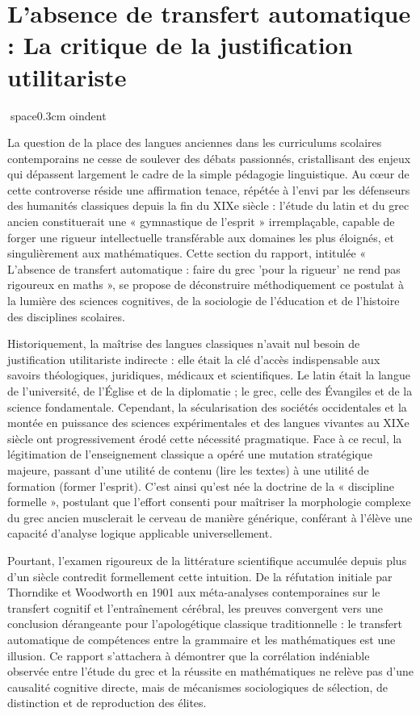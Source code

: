 

\section{L'absence de transfert automatique : La critique de la justification utilitariste}
space{0.3cm}
oindent

La question de la place des langues anciennes dans les curriculums scolaires contemporains ne cesse
de soulever des débats passionnés, cristallisant des enjeux qui dépassent largement le cadre de la
simple pédagogie linguistique. Au cœur de cette controverse réside une affirmation tenace, répétée à
l'envi par les défenseurs des humanités classiques depuis la fin du XIXe siècle : l'étude du latin
et du grec ancien constituerait une « gymnastique de l'esprit » irremplaçable, capable de forger une
rigueur intellectuelle transférable aux domaines les plus éloignés, et singulièrement aux
mathématiques.\cite{II-1-2-ref1} Cette section du rapport, intitulée « L'absence de transfert
automatique : faire du grec 'pour la rigueur' ne rend pas rigoureux en maths », se propose de
déconstruire méthodiquement ce postulat à la lumière des sciences cognitives, de la sociologie de
l'éducation et de l'histoire des disciplines scolaires.

Historiquement, la maîtrise des langues classiques n'avait nul besoin de justification utilitariste
indirecte : elle était la clé d'accès indispensable aux savoirs théologiques, juridiques, médicaux
et scientifiques. Le latin était la langue de l'université, de l'Église et de la diplomatie ; le
grec, celle des Évangiles et de la science fondamentale. Cependant, la sécularisation des sociétés
occidentales et la montée en puissance des sciences expérimentales et des langues vivantes au XIXe
siècle ont progressivement érodé cette nécessité pragmatique.\cite{II-1-2-ref3} Face à ce recul, la
légitimation de l'enseignement classique a opéré une mutation stratégique majeure, passant d'une
utilité de contenu (lire les textes) à une utilité de formation (former l'esprit). C'est ainsi
qu'est née la doctrine de la « discipline formelle », postulant que l'effort consenti pour maîtriser
la morphologie complexe du grec ancien musclerait le cerveau de manière générique, conférant à
l'élève une capacité d'analyse logique applicable universellement.\cite{II-1-2-ref4}

Pourtant, l'examen rigoureux de la littérature scientifique accumulée depuis plus d'un siècle
contredit formellement cette intuition. De la réfutation initiale par Thorndike et Woodworth en 1901
aux méta-analyses contemporaines sur le transfert cognitif et l'entraînement cérébral, les preuves
convergent vers une conclusion dérangeante pour l'apologétique classique traditionnelle : le
transfert automatique de compétences entre la grammaire et les mathématiques est une
illusion.\cite{II-1-2-ref6} Ce rapport s'attachera à démontrer que la corrélation indéniable
observée entre l'étude du grec et la réussite en mathématiques ne relève pas d'une causalité
cognitive directe, mais de mécanismes sociologiques de sélection, de distinction et de reproduction
des élites.\cite{II-1-2-ref9}

